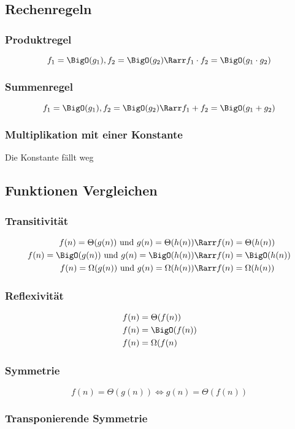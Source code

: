 		\subsection{Rechenregeln}
		\subsubsection{Produktregel}
		$$f_1=\BigO(g_1),f_2=\BigO(g_2)\Rarr f_1\cdot f_2 =\BigO(g_1\cdot g_2)$$
		\subsubsection{Summenregel}
		$$f_1=\BigO(g_1),f_2=\BigO(g_2)\Rarr f_1+f_2=\BigO(g_1+g_2)$$
		\subsubsection{Multiplikation mit einer Konstante}		
		Die Konstante fällt weg
		\subsection{Funktionen Vergleichen}
		\subsubsection{Transitivität}
		\begin{align*}
			f(n)=\Theta(g(n)) \text{ und } g(n)=\Theta(h(n)) &\Rarr f(n)=\Theta(h(n)) \\
			f(n)=\BigO(g(n)) \text{ und } g(n)=\BigO(h(n)) &\Rarr f(n)=\BigO(h(n)) \\
			f(n)=\Omega(g(n)) \text{ und } g(n)=\Omega(h(n)) &\Rarr f(n)=\Omega(h(n))
		\end{align*}
		\subsubsection{Reflexivität}
		\begin{align*}
			f(n)&=\Theta(f(n))\\
			f(n)&=\BigO(f(n))\\
			f(n)&=\Omega(f(n)
		\end{align*}
		\subsubsection{Symmetrie}

		$$f(n)=\Theta(g(n))\Leftrightarrow g(n)=\Theta(f(n))$$
		\subsubsection{Transponierende Symmetrie}
		
